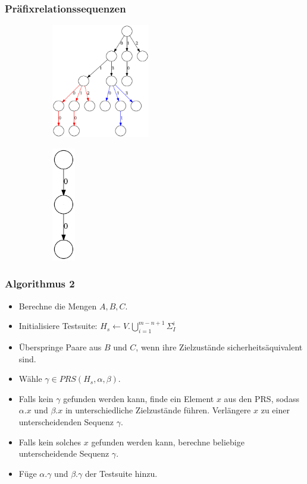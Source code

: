 \begin{frame}
  \frametitle{Präfixrelationssequenzen}
  \begin{figure}
    \begin{subfigure}[c]{0.4\textwidth}
        \centering
        \includegraphics[width=\textwidth,height=5cm,keepaspectratio]{images/PRS_HS}
    \end{subfigure}
    \begin{subfigure}[c]{0.4\textwidth}
        \centering
        \includegraphics[width=\textwidth,height=5cm,keepaspectratio]{images/PRS_PRS}
    \end{subfigure}
\end{figure}
\end{frame}

\begin{frame}
  \frametitle{Algorithmus 2}
  \begin{itemize}
    \item Berechne die Mengen $A,B,C$.
    \item Initialisiere Testsuite: $H_s \gets V.\bigcup_{i=1}^{m-n+1}\Sigma_I^i$
    \item Überspringe Paare aus $B$ und $C$, wenn ihre Zielzustände sicherheitsäquivalent sind.
    \item Wähle $\gamma \in PRS(H_s,\alpha,\beta)$.
    \item Falls kein $\gamma$ gefunden werden kann, finde ein Element $x$ aus den PRS, sodass $\alpha.x$ und $\beta.x$ in unterschiedliche Zielzustände führen. Verlängere $x$ zu einer unterscheidenden Sequenz $\gamma$.
    \item Falls kein solches $x$ gefunden werden kann, berechne beliebige unterscheidende Sequenz $\gamma$.
    \item Füge $\alpha.\gamma$ und $\beta.\gamma$ der Testsuite hinzu.
  \end{itemize}
\end{frame}

